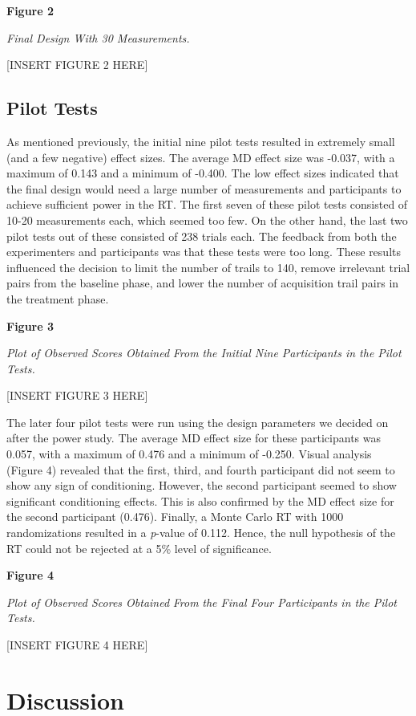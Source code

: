 \documentclass{article}
\begin{document}
\textbf{Figure 2}

\emph{Final Design With 30 Measurements.}

[INSERT FIGURE 2 HERE]

\subsection{Pilot Tests}

As mentioned previously, the initial nine pilot tests resulted in extremely small (and a few negative) effect sizes. The average MD effect size was -0.037, with a maximum of 0.143 and a minimum of -0.400. The low effect sizes indicated that the final design would need a large number of measurements and participants to achieve sufficient power in the RT. The first seven of these pilot tests consisted of 10-20 measurements each, which seemed too few. On the other hand, the last two pilot tests out of these consisted of 238 trials each. The feedback from both the experimenters and participants was that these tests were too long. These results influenced the decision to limit the number of trails to 140, remove irrelevant trial pairs from the baseline phase, and lower the number of acquisition trail pairs in the treatment phase. 

\textbf{Figure 3}

\emph{Plot of Observed Scores Obtained }\emph{From}\emph{ the Initial Nine Participants in the Pilot Tests.}

[INSERT FIGURE 3 HERE]

The later four pilot tests were run using the design parameters we decided on after the power study. The average MD effect size for these participants was 0.057, with a maximum of 0.476 and a minimum of -0.250. Visual analysis (Figure 4) revealed that the first, third, and fourth participant did not seem to show any sign of conditioning. However, the second participant seemed to show significant conditioning effects. This is also confirmed by the MD effect size for the second participant (0.476). Finally, a Monte Carlo RT with 1000 randomizations resulted in a \emph{p}-value of 0.112. Hence, the null hypothesis of the RT could not be rejected at a 5\% level of significance. 

\textbf{Figure 4}

\emph{Plot of Observed Scores Obtained }\emph{From}\emph{ the Final Four Participants in the Pilot Tests.}

[INSERT FIGURE 4 HERE]

\section{Discussion}
\end{document}
